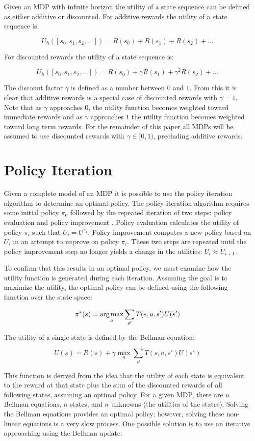 Given an MDP with infinite horizon the utility of a state sequence can be defined as either additive or discounted. For additive rewards the utility of a state sequence is:

\[
    U_h([s_0,s_1,s_2,...]) = R(s_0) + R(s_1) + R(s_2) + ...
\]

For discounted rewards the utility of a state sequence is:

\[
    U_h([s_0,s_1,s_2,...]) = R(s_0) + \gamma R(s_1) + \gamma^2 R(s_2) + ...
\]

The discount factor $\gamma$ is defined as a number between $0$ and $1$. From this it is clear that additive rewards is a special case of discounted rewards with $\gamma = 1$.  Note that as $\gamma$ approaches $0$, the utility function becomes weighted toward immediate rewards and as $\gamma$ approaches $1$ the utility function becomes weighted toward long term rewards. For the remainder of this paper all MDPs will be assumed to use discounted rewards with $\gamma \in [0, 1)$, precluding additive rewards.

\section{Policy Iteration}

Given a complete model of an MDP it is possible to use the policy iteration algorithm to determine an optimal policy. The policy iteration algorithm requires some initial policy $\pi_0$ followed by the repeated iteration of two steps: policy evaluation and policy improvement \cite{norvig}. Policy evaluation calculates the utility of policy $\pi_i$ such that $U_i = U^{\pi_i}$. Policy improvement computes a new policy based on $U_i$ in an attempt to improve on policy $\pi_i$. These two steps are repeated until the policy improvement step no longer yields a change in the utilities: $U_i \approx U_{i+1}$.

To confirm that this results in an optimal policy, we must examine how the utility function is generated during each iteration. Assuming the goal is to maximize the utility, the optimal policy can be defined using the following function over the state space:

\[
    \pi^*(s) = \operatorname*{arg\,max}_a \sum_{s'} T(s,a,s')U(s')
\]

The utility of a single state is defined by the Bellman equation:

\[
    U(s) = R(s) + \gamma \max_a \sum_{s'}T(s,a,s')U(s')
\]

This function is derived from the idea that the utility of each state is equivalent to the reward at that state plus the sum of the discounted rewards of all following states, assuming an optimal policy. For a given MDP, there are $n$ Bellman equations, $n$ states, and $n$ unknowns (the utilities of the states). Solving the Bellman equations provides an optimal policy; however, solving these non-linear equations is a very slow process. One possible solution is to use an iterative approaching using the Bellman update:

